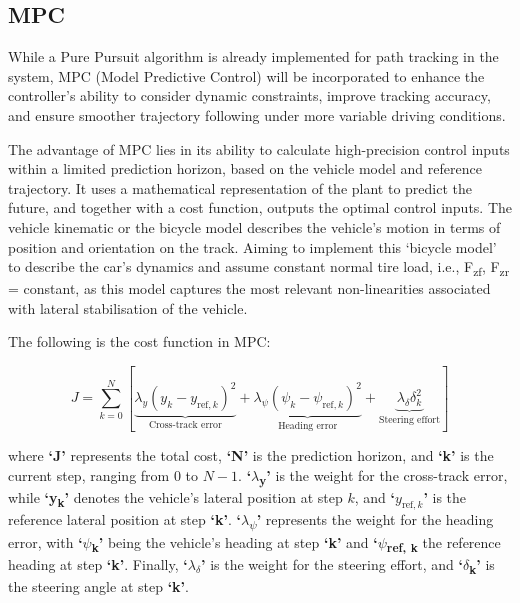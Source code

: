 \documentclass[conference]{IEEEtran}
\begin{document}
\subsection{MPC}
While a Pure Pursuit algorithm is already implemented for path tracking in the system, MPC (Model Predictive Control) will be incorporated to enhance the controller’s ability to consider dynamic constraints, improve tracking accuracy, and ensure smoother trajectory following under more variable driving conditions.

The advantage of MPC lies in its ability to calculate high-precision control inputs within a limited prediction horizon, based on the vehicle model and reference trajectory. It uses a mathematical representation of the plant to predict the future, and together with a cost function, outputs the optimal control inputs.  The vehicle kinematic or the bicycle model describes the vehicle's motion in terms of position and orientation on the track. Aiming to implement this ‘bicycle model’ to describe the car's dynamics and assume constant normal tire load, i.e., F\textsubscript{zf}, F\textsubscript{zr} = constant, as this model captures the most relevant non-linearities associated with lateral stabilisation of the vehicle. 

The following is the cost function in MPC:

\[
J = \sum_{k=0}^{N} \left[ 
\underbrace{\lambda_y (y_k - y_{\text{ref},k})^2}_{\text{Cross-track error}} + 
\underbrace{\lambda_\psi (\psi_k - \psi_{\text{ref},k})^2}_{\text{Heading error}} + 
\underbrace{\lambda_\delta \delta_k^2}_{\text{Steering effort}} 
\right]
\]

where \textbf{‘J'} represents the total cost, \textbf{‘N'} is the prediction horizon, and \textbf{‘k'} is the current step, ranging from \( 0 \) to \( N-1 \). \textbf{‘$\lambda$\textsubscript{y}'} is the weight for the cross-track error, while \textbf{‘y\textsubscript{k}'} denotes the vehicle's lateral position at step \( k \), and \textbf{‘$y_{\text{ref},k}$’} is the reference lateral position at step \textbf{‘k’}. \textbf{‘$\lambda$\textsubscript{$\psi$}’} represents the weight for the heading error, with \textbf{‘$\psi$\textsubscript{k}’} being the vehicle's heading at step \textbf{‘k’} and \textbf{‘$\psi$\textsubscript{{ref, k}}} the reference heading at step \textbf{‘k’}. Finally, \textbf{‘$\lambda_{\delta}$’} is the weight for the steering effort, and \textbf{‘$\delta$\textsubscript{k}’} is the steering angle at step \textbf{‘k’}.



\vspace{12pt}
\end{document}
